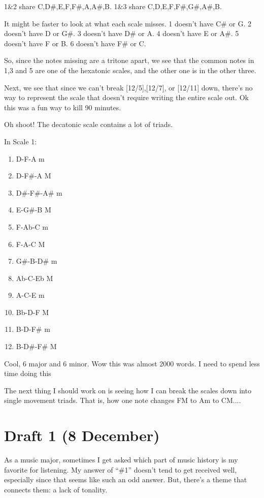 \documentclass[12pt]{article}[titlepage]
\newcommand{\say}[1]{``\#1''}
\newcommand{\1}{\={a}}
\newcommand{\2}{\={e}}
\newcommand{\3}{\={\i}}
\newcommand{\4}{\=o}
\newcommand{\5}{\=u}
\newcommand{\6}{\={A}}
\renewcommand{\,}{\textsuperscript{,}}
\begin{document}
1\&2 share C,D\#,E,F,F\#,A,A\#,B.
1\&3 share C,D,E,F,F\#,G\#,A\#,B.

It might be faster to look at what each scale misses.
1 doesn't have C\# or G.
2 doesn't have D or G\#.
3 doesn't have D\# or A.
4 doesn't have E or A\#.
5 doesn't have F or B.
6 doesn't have F\# or C.

So, since the notes missing are a tritone apart, we see that the common notes in 1,3 and 5 are one of the hexatonic scales, and the other one is in the other three.

Next, we see that since we can't break [12/5],[12/7], or [12/11] down, there's no way to represent the scale that doesn't require writing the entire scale out.
Ok this was a fun way to kill 90 minutes.

Oh shoot!
The decatonic scale contains a lot of triads.

In Scale 1:
\begin{enumerate}
\item D-F-A m 
\item D-F\#-A M 
\item D\#-F\#-A\# m
\item E-G\#-B M
\item F-Ab-C m
\item F-A-C M
\item G\#-B-D\# m
\item Ab-C-Eb M
\item A-C-E m
\item Bb-D-F M
\item B-D-F\# m
\item B-D\#-F\# M
\end{enumerate}

Cool, 6 major and 6 minor.
Wow this was almost 2000 words.
I need to spend less time doing this

The next thing I should work on is seeing how I can break the scales down into single movement triads.
That is, how one note changes FM to Am to CM.... 

\section{Draft 1 (8 December)}
As a music major, sometimes I get asked which part of music history is my favorite for listening.
My answer of \say{everything that's before Baroque or after Romantic} doesn't tend to get received well, especially since that seems like such an odd answer.
But, there's a theme that connects them: a lack of tonality.
\end{document}
